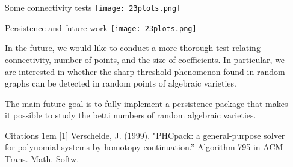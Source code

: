 \documentclass{beamer}
\begin{document}
\begin{frame}{}
\begin{columns}[t]
\begin{column}{0.32\linewidth}
\end{column}%

\begin{column}{0.32\linewidth}

\begin{block}{Some connectivity tests}
\texttt{[image: 23plots.png]}
\end{block}



\begin{block}{Persistence and future work}
\texttt{[image: 23plots.png]}

In the future, we would like to conduct a more thorough test relating
connectivity, number of points, and the size of coefficients. In particular, we
are interested in whether the sharp-threshold phenomenon found in random graphs
can be detected in random points of algebraic varieties.

The main future goal is to fully implement a persistence package that makes it
possible to study the betti numbers of random algebraic varieties.

\end{block}
\begin{block}{Citations}
\hangindent1em
[1] Verschelde, J. (1999). "PHCpack: a general-purpose solver for polynomial systems by homotopy continuation.'' Algorithm 795 in  ACM Trans. Math. Softw. 
\\


\end{block}

\end{column}%

\end{columns}
\end{frame}
\end{document}
